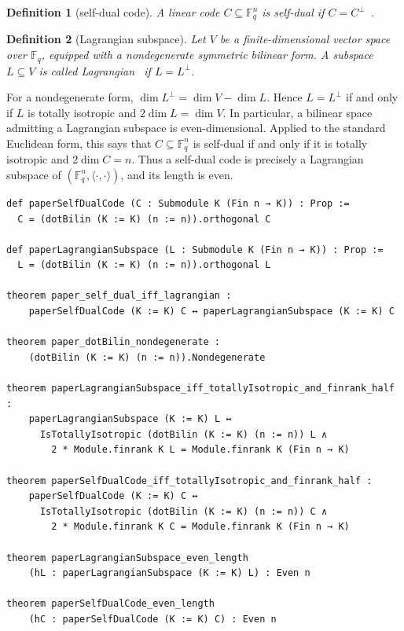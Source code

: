 \documentclass[12pt]{article}
\newtheorem{defn}{Definition}[section]
\newcommand{\F}{\mathbb{F}}
\begin{document}
\begin{defn}[self-dual code]\label{def:sd}
{\rm
A linear code $C \subseteq \F_q^n$ is \emph{self-dual} if
$C=C^\perp$~\cite{Pless1965}.
}
\end{defn}

\begin{defn}[Lagrangian subspace]\label{def:lagrangian}
{\rm
Let \(V\) be a finite-dimensional vector space over \(\F_q\), equipped
with a nondegenerate symmetric bilinear form. A subspace \(L\subseteq V\)
is called \emph{Lagrangian}~\cite{Mon,Ser} if \(L=L^\perp\).
}
\end{defn}

\noindent
For a nondegenerate form,
\(\dim L^\perp=\dim V-\dim L\). Hence \(L=L^\perp\) if and only if
\(L\) is totally isotropic and \(2\dim L=\dim V\). In particular, a
bilinear space admitting a Lagrangian subspace is even-dimensional.
Applied to the standard Euclidean form, this says that
\(C\subseteq\F_q^n\) is self-dual if and only if it is totally isotropic
and \(2\dim C=n\). Thus a self-dual code is precisely a Lagrangian
subspace of \((\F_q^n,\langle\cdot,\cdot\rangle)\), and its length is even.

\begin{lstlisting}[caption={Lean for Definitions~\ref{def:sd} and~\ref{def:lagrangian}.}]
def paperSelfDualCode (C : Submodule K (Fin n → K)) : Prop :=
  C = (dotBilin (K := K) (n := n)).orthogonal C

def paperLagrangianSubspace (L : Submodule K (Fin n → K)) : Prop :=
  L = (dotBilin (K := K) (n := n)).orthogonal L

theorem paper_self_dual_iff_lagrangian :
    paperSelfDualCode (K := K) C ↔ paperLagrangianSubspace (K := K) C

theorem paper_dotBilin_nondegenerate :
    (dotBilin (K := K) (n := n)).Nondegenerate

theorem paperLagrangianSubspace_iff_totallyIsotropic_and_finrank_half :
    paperLagrangianSubspace (K := K) L ↔
      IsTotallyIsotropic (dotBilin (K := K) (n := n)) L ∧
        2 * Module.finrank K L = Module.finrank K (Fin n → K)

theorem paperSelfDualCode_iff_totallyIsotropic_and_finrank_half :
    paperSelfDualCode (K := K) C ↔
      IsTotallyIsotropic (dotBilin (K := K) (n := n)) C ∧
        2 * Module.finrank K C = Module.finrank K (Fin n → K)

theorem paperLagrangianSubspace_even_length
    (hL : paperLagrangianSubspace (K := K) L) : Even n

theorem paperSelfDualCode_even_length
    (hC : paperSelfDualCode (K := K) C) : Even n
\end{lstlisting}
\end{document}
